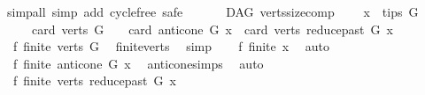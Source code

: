 \begin{isabellebody}
%
\isadelimproof
%
\endisadelimproof
%
\isatagproof
{}\isamarkupfalse%
{\isacharparenleft}{\kern0pt}simp{\isacharunderscore}{\kern0pt}all{\isacharcomma}{\kern0pt}\ simp\ add{\isacharcolon}{\kern0pt}\ cycle{\isacharunderscore}{\kern0pt}free{\isacharcomma}{\kern0pt}\ safe{\isacharparenright}{\kern0pt}\ \isamarkupfalse%
%
\endisatagproof
{\isafoldproof}%
%
\isadelimproof
\isanewline
%
\endisadelimproof
\ \isanewline
\ \isanewline
{}\isamarkupfalse%
\ {\isacharparenleft}{\kern0pt}\ DAG{\isacharparenright}{\kern0pt}\ verts{\isacharunderscore}{\kern0pt}size{\isacharunderscore}{\kern0pt}comp{\isacharcolon}{\kern0pt}\isanewline
\ \ \ \ {\isachardoublequoteopen}x\ {\isasymin}\ tips\ G{\isachardoublequoteclose}\isanewline
\ \ \ \ {\isachardoublequoteopen}card\ {\isacharparenleft}{\kern0pt}verts\ G{\isacharparenright}{\kern0pt}\ {\isacharequal}{\kern0pt}\ {}\ {\isacharplus}{\kern0pt}\ card\ {\isacharparenleft}{\kern0pt}anticone\ G\ x{\isacharparenright}{\kern0pt}\ {\isacharplus}{\kern0pt}\ card\ {\isacharparenleft}{\kern0pt}verts\ {\isacharparenleft}{\kern0pt}reduce{\isacharunderscore}{\kern0pt}past\ G\ x{\isacharparenright}{\kern0pt}{\isacharparenright}{\kern0pt}{\isachardoublequoteclose}\isanewline
%
\isadelimproof
%
\endisadelimproof
%
\isatagproof
{}\isamarkupfalse%
\ {\isacharminus}{\kern0pt}\isanewline
\ \ \isamarkupfalse%
\ f{}{\isacharcolon}{\kern0pt}\ {\isachardoublequoteopen}finite\ {\isacharparenleft}{\kern0pt}verts\ G{\isacharparenright}{\kern0pt}{\isachardoublequoteclose}\ \isamarkupfalse%
\ finite{\isacharunderscore}{\kern0pt}verts\ \isamarkupfalse%
\ simp\isanewline
\ \ \isamarkupfalse%
\ f{}{\isacharcolon}{\kern0pt}\ {\isachardoublequoteopen}finite\ {\isacharbraceleft}{\kern0pt}x{\isacharbraceright}{\kern0pt}{\isachardoublequoteclose}\ \isamarkupfalse%
\ auto\isanewline
\ \ \isamarkupfalse%
\ f{}{\isacharcolon}{\kern0pt}\ {\isachardoublequoteopen}finite\ {\isacharparenleft}{\kern0pt}anticone\ G\ x{\isacharparenright}{\kern0pt}{\isachardoublequoteclose}\ \isamarkupfalse%
\ anticone{\isachardot}{\kern0pt}simps\ \isamarkupfalse%
\ auto\isanewline
\ \ \isamarkupfalse%
\ f{}{\isacharcolon}{\kern0pt}\ {\isachardoublequoteopen}finite\ {\isacharparenleft}{\kern0pt}verts\ {\isacharparenleft}{\kern0pt}reduce{\isacharunderscore}{\kern0pt}past\ G\ x{\isacharparenright}{\kern0pt}{\isacharparenright}{\kern0pt}{\isachardoublequoteclose}\ \isamarkupfalse%

\end{isabellebody}
